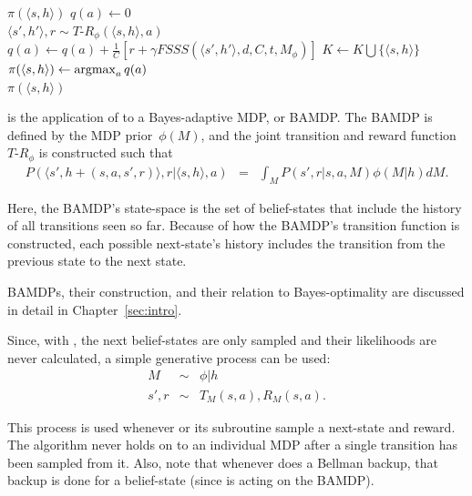 \begin{algorithm}[tb]
	\caption{$\mbox{BFS3}(s, h, d, C, t, \phi)$}
	\label{alg:bfs3}
	 {
		\Return $\pi(\langle s,h \rangle)$
	}
	 {
		$q(a) \leftarrow 0$\\
		 {
			$\langle s', h'\rangle , r \sim {T\mbox{-}R}_\phi(\langle s,h\rangle, a)$\\
			$q(a) \leftarrow q(a) + \frac 1 C \left[r+ \gamma FSSS(\langle s', h'\rangle, d, C, t, M_\phi)\right]$
		}
	}
	$K \leftarrow K \bigcup \{\langle s,h\rangle\}$\\
	$\pi(\langle s,h\rangle) \leftarrow \argmax_a q(a)$\\
	\Return $\pi(\langle s,h\rangle)$\\
\end{algorithm}


 is the application of  to a Bayes-adaptive MDP, or BAMDP. The BAMDP is defined by the MDP prior~$\phi(M)$, and the joint transition and reward function ${T\mbox{-}R}_\phi$ is constructed such that
\begin{eqnarray*}
P(\langle s', h + (s,a,s',r)\rangle, r | \langle s, h\rangle, a) &=& \int_M P(s', r | s, a, M)\phi(M|h) dM.
\end{eqnarray*}

Here, the BAMDP's state-space is the set of belief-states that include the history of all transitions seen so far. Because of how the BAMDP's transition function is constructed, each possible next-state's history includes the transition from the previous state to the next state.

BAMDPs, their construction, and their relation to Bayes-optimality are discussed in detail in Chapter~\ref{sec:intro}.

Since, with , the next belief-states are only sampled and their likelihoods are never calculated, a simple generative process can be used:
\begin{eqnarray}
M &\sim& \phi|h \label{eq:oracle1}\\
s', r &\sim& T_M(s,a), R_M(s,a).\label{eq:oracle2}
\end{eqnarray}

This process is used whenever  or its subroutine  sample a next-state and reward. The algorithm never holds on to an individual MDP after a single transition has been sampled from it. Also, note that whenever  does a Bellman backup, that backup is done for a belief-state (since  is acting on the BAMDP).

